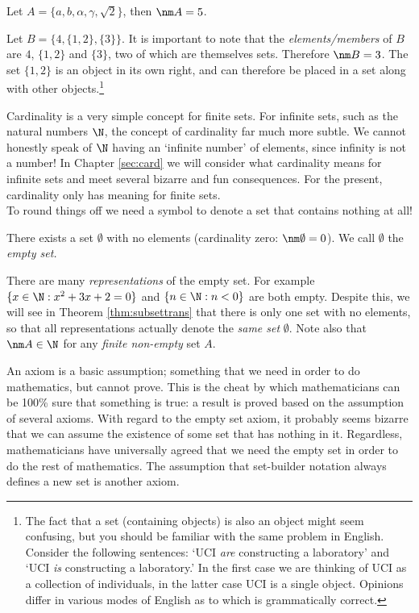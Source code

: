 \begin{examples}
\item Let $A=\{a,b,\alpha,\gamma,\sqrt 2\}$, then $\nm A=5$.
\item Let $B=\Big\{4,\{1,2\},\{3\}\Big\}$. It is important to note that the \emph{elements/members} of $B$ are $4$, $\{1,2\}$ and $\{3\}$, two of which are themselves sets. Therefore $\nm B=3$. The set $\{1,2\}$ is an object in its own right, and can therefore be placed in a set along with other objects.\footnote{The fact that a set (containing objects) is also an object might seem confusing, but you should be familiar with the same problem in English. Consider the following sentences: `UCI \emph{are} constructing a laboratory' and `UCI \emph{is} constructing a laboratory.' In the first case we are thinking of UCI as a collection of individuals, in the latter case UCI is a single object. Opinions differ in various modes of English as to which is grammatically correct.}
\end{examples}

\noindent Cardinality is a very simple concept for finite sets. For infinite sets, such as the natural numbers $\N$, the concept of cardinality far much more subtle. We cannot honestly speak of $\N$ having an `infinite number' of elements, since infinity is not a number! In Chapter \ref{sec:card} we will consider what cardinality means for infinite sets and meet several bizarre and fun consequences. For the present, cardinality only has meaning for finite sets.\\

To round things off we need a symbol to denote a set that contains nothing at all!

\begin{axiom}
There exists a set $\emptyset$ with no elements (cardinality zero: $\nm\emptyset=0$). We call $\emptyset$ the \emph{empty set.}
\end{axiom}

\noindent There are many \emph{representations} of the empty set. For example $\{x\in\N:x^2+3x+2=0\}$ and $\{n\in\N:n<0\}$ are both empty. Despite this, we will see in Theorem \hyperlink{thm:subsettranslnk}{\ref*{thm:subsettrans}} that there is only one set with no elements, so that all representations actually denote the \emph{same set} $\emptyset$. 
Note also that $\nm A\in\N$ for any \emph{finite non-empty} set $A$. 

\begin{aside}

An axiom is a basic assumption; something that we need in order to do mathematics, but cannot prove. This is the cheat by which mathematicians can be 100\% sure that something is true: a result is proved based on the assumption of several axioms. With regard to the empty set axiom, it probably seems bizarre that we can assume the existence of some set that has nothing in it. Regardless, mathematicians have universally agreed that we need the empty set in order to do the rest of mathematics. The assumption that set-builder notation always defines a new set is another axiom.
\end{aside}

